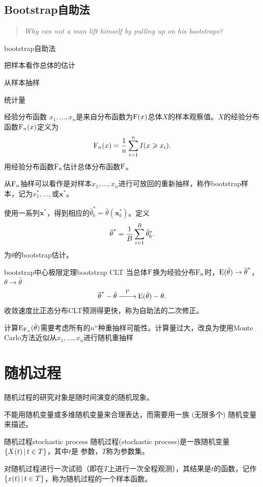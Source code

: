 \subsection{Bootstrap自助法}
\begin{quote}
	\textit{Why can not a man lift himself by pulling up on his bootstraps?}
\end{quote}
\begin{method}{bootstrap自助法}{}
	\begin{compactenum}
		\item 把样本看作总体的估计
		\item 从样本抽样
		\item 统计量
	\end{compactenum}
\end{method}
\begin{definition}{经验分布函数}{}
	$x_1,\ldots,x_n$是来自分布函数为$\operatorname{F}(x)$总体$X$的样本观察值。$X$的经验分布函数$\operatorname{F}_n(x)$定义为
	\begin{align}
		\operatorname{F}_n(x)=\frac1n\sum_{i=1}^nI(x\geqslant x_i).
	\end{align}
	用经验分布函数$\operatorname{F}_n$估计总体分布函数$\operatorname{F}$。
\end{definition}
从$\operatorname{F}_n$抽样可以看作是对样本$x_1,\ldots,x_n$进行可放回的重新抽样，称作bootstrap样本，记为$x_1^\ast,\ldots,$或$\bm x^\ast$。

使用一系列$\bm x^\ast$，得到相应的$\hat\theta_b^\ast=\hat\theta(\bm x_b^\ast)$。定义
\[
	\overline\theta^\ast=\frac1B\sum_{i=1}^B\hat\theta_b^\ast.
\]
为$\theta$的bootstrap估计。
\begin{theorem}{bootstrap中心极限定理}{bootstrap CLT}
	当总体$\operatorname{F} $换为经验分布$\operatorname{F}_n $时，$\operatorname{E}(\hat\theta)\to\overline\theta^\ast$，$\theta\to\hat\theta$
	\begin{align}
		\overline\theta^\ast-\hat\theta\overset{\operatorname{P}}{-\hspace{-4 pt}-\hspace{-5 pt}\longrightarrow}\operatorname{E}(\hat\theta)-\theta.
	\end{align}
	收敛速度比正态分布CLT预测得更快，称为自助法的二次修正。
\end{theorem}
计算$\operatorname{E}_{\operatorname{F}_n}(\hat\theta)$需要考虑所有的$n^n$种重抽样可能性。计算量过大，改良为使用Monte Carlo方法近似从$ x_1, \ldots, x_n $进行随机重抽样
\clearpage
\section{随机过程}
随机过程的研究对象是随时间演变的随机现象。

不能用随机变量或多维随机变量来合理表达，而需要用一族 (无限多个) 随机变量来描述。
\begin{definition}{随机过程}{stochastic process}
	随机过程(stochastic process)是一族随机变量$\left\{X(t)\,\middle\vert\,t\in T\right\}$，其中$ t $是 参数，$T$称为参数集。
\end{definition}
对随机过程进行一次试验（即在$ T $上进行一次全程观测），其结果是$t$的函数，记作$\left\{x(t)\,\middle\vert\,t\in T\right\}$，称为随机过程的一个样本函数。

